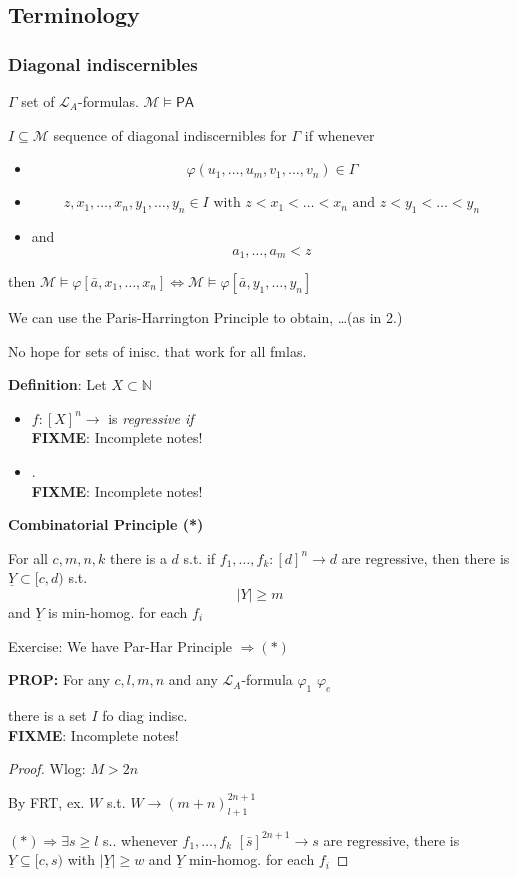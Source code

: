 \documentclass[12pt]{article}
\newcommand{\Nat}{\ensuremath{\mathbb{N}}}
\newcommand{\PA}{\ensuremath{\mathsf{PA}}}
\newcommand{\defn}{\textbf{Definition}: }
\newcommand{\fixme}{\\ \textbf{FIXME}: Incomplete notes!}
\begin{document}
\subsection{Terminology}
\subsubsection{Diagonal indiscernibles}
$\Gamma$ set of $\mathcal{L}_A$-formulas.
$\mathcal{M} \models \PA$

$I \subseteq \mathcal{M}$ sequence of diagonal indiscernibles for $\Gamma$
if whenever
\begin{itemize}
  \item \[\varphi(u_1, \dots, u_m, v_1, \dots, v_n) \in \Gamma\]
  \item \[z, x_1, \dots, x_n, y_1, \dots, y_n \in I \text{ with }
    z < x_1 < \dots < x_n \text{ and } z < y_1 < \dots < y_n\]
  \item and \[a_1,\dots,a_m < z\] 
\end{itemize}
then $\mathcal{M} \models \varphi[\bar{a}, x_1, \dots, x_n] \Leftrightarrow
\mathcal{M} \models \varphi[\bar{a}, y_1, \dots, y_n]$


We can use the Paris-Harrington Principle to obtain, \dots (as in 2.)

No hope for sets of inisc. that work for all fmlas.

\defn
Let $X \subset \Nat$
\begin{itemize}
  \item $f : [X]^n \rightarrow$ is \emph{regressive if}
    \fixme
  \item .\fixme
\end{itemize}

\textbf{
Combinatorial Principle (*)
}

For all $c,m,n,k$ there is a $d$ s.t. if 
$f_1, \dots, f_k : [d]^n \rightarrow d$ are regressive,
then there is $\underline{Y} \subset [c,d)$ s.t.
\[
|Y| \ge m
\]
and $\underline{Y}$ is min-homog. for each $f_i$

Exercise:
We have Par-Har Principle $\Rightarrow (*)$


\textbf{PROP:}
For any $c, l, m, n$ and any 
$\mathcal{L}_A$-formula 
$\varphi_1$
$\varphi_e$

there is a set $I$ fo diag indisc.
\fixme

\begin{proof}
  Wlog: $M > 2n$

  By FRT, ex. $W$ s.t. $W \rightarrow \left( m+n \right)^{2n+1}_{l+1}$

  $(*) \Rightarrow \exists s \ge l$ s.. whenever $f_1,\dots,f_k$  $[\bar{s}]^{2n+1} \rightarrow s$
  are regressive, there is $\underline{Y} \subseteq [c,s)$ with
  $|\underline{Y}| \ge w$ and $\underline{Y}$ min-homog. for each $f_i$
\end{proof}
\end{document}
